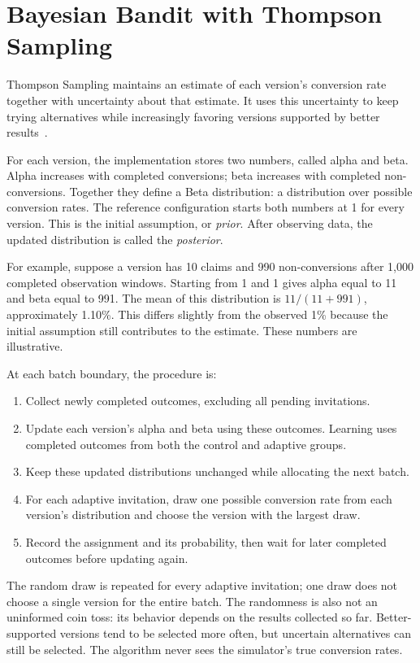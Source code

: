 \section{Bayesian Bandit with Thompson Sampling}
\label{sec:method_ts}

Thompson Sampling maintains an estimate of each version's conversion rate together with uncertainty about that estimate. It uses this uncertainty to keep trying alternatives while increasingly favoring versions supported by better results~\cite{russo2018tutorial}.

For each version, the implementation stores two numbers, called alpha and beta. Alpha increases with completed conversions; beta increases with completed non-conversions. Together they define a Beta distribution: a distribution over possible conversion rates. The reference configuration starts both numbers at 1 for every version. This is the initial assumption, or \emph{prior}. After observing data, the updated distribution is called the \emph{posterior}.

For example, suppose a version has 10 claims and 990 non-conversions after 1,000 completed observation windows. Starting from 1 and 1 gives alpha equal to 11 and beta equal to 991. The mean of this distribution is $11/(11+991)$, approximately 1.10\%. This differs slightly from the observed 1\% because the initial assumption still contributes to the estimate. These numbers are illustrative.

At each batch boundary, the procedure is:
\begin{enumerate}
    \item Collect newly completed outcomes, excluding all pending invitations.
    \item Update each version's alpha and beta using these outcomes. Learning uses completed outcomes from both the control and adaptive groups.
    \item Keep these updated distributions unchanged while allocating the next batch.
    \item For each adaptive invitation, draw one possible conversion rate from each version's distribution and choose the version with the largest draw.
    \item Record the assignment and its probability, then wait for later completed outcomes before updating again.
\end{enumerate}

The random draw is repeated for every adaptive invitation; one draw does not choose a single version for the entire batch. The randomness is also not an uninformed coin toss: its behavior depends on the results collected so far. Better-supported versions tend to be selected more often, but uncertain alternatives can still be selected. The algorithm never sees the simulator's true conversion rates.

